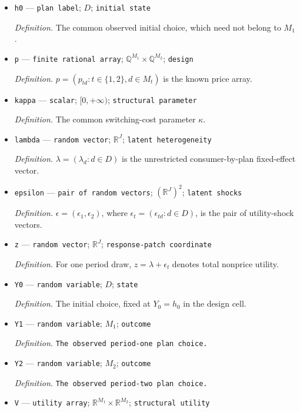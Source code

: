 \documentclass{article}
\begin{document}
\begin{itemize}
  \item \texttt{h0} --- \texttt{plan label}; \(D\); \texttt{initial state}
  \par\smallskip\noindent\emph{Definition.} The common observed initial choice, which need not belong to \(M_1\).
  \item \texttt{p} --- \texttt{finite rational array}; \(\mathbb Q^{M_1}\times\mathbb Q^{M_2}\); \texttt{design}
  \par\smallskip\noindent\emph{Definition.} \(p=(p_{td}:t\in\{1,2\},d\in M_t)\) is the known price array.
  \item \texttt{kappa} --- \texttt{scalar}; \([0,+\infty)\); \texttt{structural parameter}
  \par\smallskip\noindent\emph{Definition.} The common switching-cost parameter \(\kappa\).
  \item \texttt{lambda} --- \texttt{random vector}; \(\mathbb R^J\); \texttt{latent heterogeneity}
  \par\smallskip\noindent\emph{Definition.} \(\lambda=(\lambda_d:d\in D)\) is the unrestricted consumer-by-plan fixed-effect vector.
  \item \texttt{epsilon} --- \texttt{pair of random vectors}; \((\mathbb R^J)^2\); \texttt{latent shocks}
  \par\smallskip\noindent\emph{Definition.} \(\epsilon=(\epsilon_1,\epsilon_2)\), where \(\epsilon_t=(\epsilon_{td}:d\in D)\), is the pair of utility-shock vectors.
  \item \texttt{z} --- \texttt{random vector}; \(\mathbb R^J\); \texttt{response-\allowbreak{}patch coordinate}
  \par\smallskip\noindent\emph{Definition.} For one period draw, \(z=\lambda+\epsilon_t\) denotes total nonprice utility.
  \item \texttt{Y0} --- \texttt{random variable}; \(D\); \texttt{state}
  \par\smallskip\noindent\emph{Definition.} The initial choice, fixed at \(Y_0=h_0\) in the design cell.
  \item \texttt{Y1} --- \texttt{random variable}; \(M_1\); \texttt{outcome}
  \par\smallskip\noindent\emph{Definition.} \texttt{The observed period-\allowbreak{}one plan choice.}
  \item \texttt{Y2} --- \texttt{random variable}; \(M_2\); \texttt{outcome}
  \par\smallskip\noindent\emph{Definition.} \texttt{The observed period-\allowbreak{}two plan choice.}
  \item \texttt{V} --- \texttt{utility array}; \(\mathbb R^{M_1}\times\mathbb R^{M_2}\); \texttt{structural utility}

\end{itemize}
\end{document}
